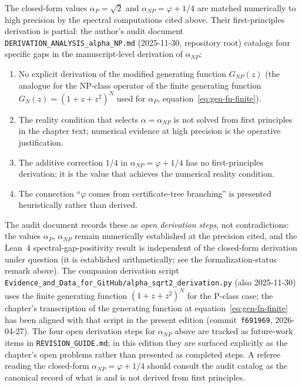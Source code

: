 \begin{remark}\label{rem:alpha-P-NP-derivation-status}
The closed-form values $\alpha_P = \sqrt{2}$ and $\alpha_{NP} = \varphi + 1/4$ are matched numerically to high precision by the spectral computations cited above. Their first-principles derivation is partial: the author's audit document \texttt{DERIVATION\_ANALYSIS\_alpha\_NP.md} (2025-11-30, repository root) catalogs four specific gaps in the manuscript-level derivation of $\alpha_{NP}$:
\begin{enumerate}
\item No explicit derivation of the modified generating function $G_{NP}(z)$ (the analogue for the NP-class operator of the finite generating function $G_N(z) = (1+z+z^2)^N$ used for $\alpha_P$, equation~\ref{eq:gen-fn-finite}).
\item The reality condition that selects $\alpha = \alpha_{NP}$ is not solved from first principles in the chapter text; numerical evidence at high precision is the operative justification.
\item The additive correction $1/4$ in $\alpha_{NP} = \varphi + 1/4$ has no first-principles derivation; it is the value that achieves the numerical reality condition.
\item The connection ``$\varphi$ comes from certificate-tree branching'' is presented heuristically rather than derived.
\end{enumerate}
The audit document records these as \emph{open derivation steps}, not contradictions: the values $\alpha_P$, $\alpha_{NP}$ remain numerically established at the precision cited, and the Lean~4 spectral-gap-positivity result is independent of the closed-form derivation under question (it is established arithmetically; see the formalization-status remark above). The companion derivation script \texttt{Evidence\_and\_Data\_for\_GitHub/alpha\_sqrt2\_derivation.py} (also 2025-11-30) uses the finite generating function $(1+z+z^2)^N$ for the P-class case; the chapter's transcription of the generating function at equation~\eqref{eq:gen-fn-finite} has been aligned with that script in the present edition (commit~\texttt{f691969}, 2026-04-27). The four open derivation steps for $\alpha_{NP}$ above are tracked as future-work items in \texttt{REVISION\_GUIDE.md}; in this edition they are surfaced explicitly as the chapter's open problems rather than presented as completed steps. A referee reading the closed-form $\alpha_{NP} = \varphi + 1/4$ should consult the audit catalog as the canonical record of what is and is not derived from first principles.


\end{remark}
